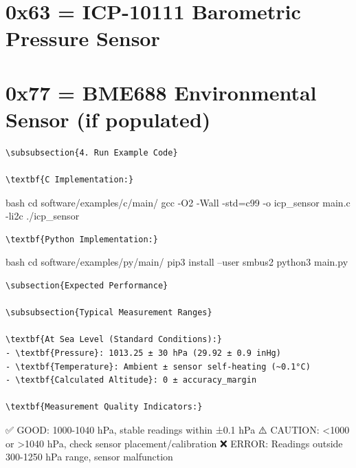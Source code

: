 \documentclass[11pt,a4paper]{article}
\begin{document}
\setcounter{section}{0}
\section{0x63 = ICP-10111 Barometric Pressure Sensor}


\setcounter{section}{0}
\section{0x77 = BME688 Environmental Sensor (if populated)}

\begin{lstlisting}[language=text]
\subsubsection{4. Run Example Code}

\textbf{C Implementation:}
\end{lstlisting}bash
cd software/examples/c/main/
gcc -O2 -Wall -std=c99 -o icp_sensor main.c -li2c
./icp_sensor
\begin{lstlisting}[language=text]
\textbf{Python Implementation:}
\end{lstlisting}bash
cd software/examples/py/main/
pip3 install --user smbus2
python3 main.py
\begin{lstlisting}[language=text]
\subsection{Expected Performance}

\subsubsection{Typical Measurement Ranges}

\textbf{At Sea Level (Standard Conditions):}
- \textbf{Pressure}: 1013.25 ± 30 hPa (29.92 ± 0.9 inHg)
- \textbf{Temperature}: Ambient ± sensor self-heating (~0.1°C)
- \textbf{Calculated Altitude}: 0 ± accuracy_margin

\textbf{Measurement Quality Indicators:}
\end{lstlisting}
✅ GOOD:     1000-1040 hPa, stable readings within ±0.1 hPa
⚠️  CAUTION: <1000 or >1040 hPa, check sensor placement/calibration  
❌ ERROR:    Readings outside 300-1250 hPa range, sensor malfunction
\end{document}
